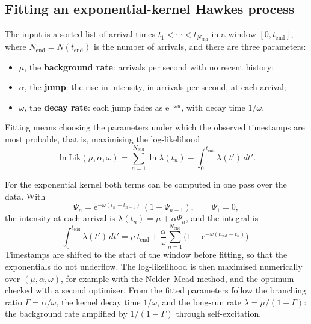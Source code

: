 \subsection{Fitting an exponential-kernel Hawkes process}
\label{app:pp-mle}

The input is a sorted list of arrival times $t_1 < \cdots < t_{N_{\text{end}}}$ in a window
$[0, t_{\text{end}}]$, where $N_{\text{end}} = N(t_{\text{end}})$ is the number of arrivals, and
there are three parameters:
\begin{itemize}[leftmargin=1.5em,itemsep=1pt]
\item $\mu$, the \textbf{background rate}: arrivals per second with no recent history;
\item $\alpha$, the \textbf{jump}: the rise in intensity, in arrivals per second, at each arrival;
\item $\omega$, the \textbf{decay rate}: each jump fades as $\mathrm{e}^{-\omega u}$, with decay time
  $1/\omega$.
\end{itemize}
Fitting means choosing the parameters under which the observed timestamps are most probable, that
is, maximising the log-likelihood~\citep{ozaki1979}
\begin{equation}
  \ln \mathrm{Lik}(\mu, \alpha, \omega) = \sum_{n=1}^{N_{\text{end}}} \ln \lambda(t_n)
  - \int_0^{t_{\text{end}}} \lambda(t')\, dt'.
  \label{eq:hawkes-loglik}
\end{equation}

For the exponential kernel both terms can be computed in one pass over the data. With
\[
  \Psi_n = \mathrm{e}^{-\omega (t_n - t_{n-1})}\,(1 + \Psi_{n-1}), \qquad \Psi_1 = 0,
\]
the intensity at each arrival is $\lambda(t_n) = \mu + \alpha \Psi_n$, and the integral is
\[
  \int_0^{t_{\text{end}}} \lambda(t')\, dt' = \mu\, t_{\text{end}}
  + \frac{\alpha}{\omega} \sum_{n=1}^{N_{\text{end}}} \Big(1 - \mathrm{e}^{-\omega (t_{\text{end}} - t_n)}\Big).
\]
Timestamps are shifted to the start of the window before fitting, so that the exponentials do not
underflow. The log-likelihood is then maximised numerically over $(\mu, \alpha, \omega)$, for example
with the Nelder--Mead method, and the optimum checked with a second optimiser. From the fitted
parameters follow the branching ratio $\Gamma = \alpha/\omega$, the kernel decay time $1/\omega$, and
the long-run rate $\bar\lambda = \mu/(1 - \Gamma)$: the background rate amplified by $1/(1-\Gamma)$
through self-excitation.

